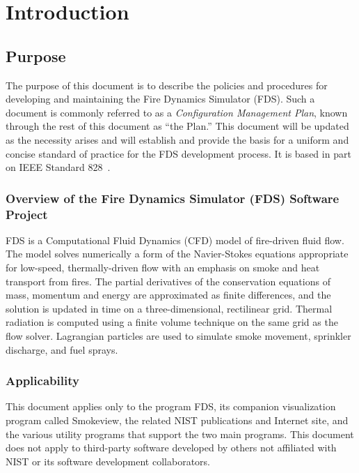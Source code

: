 \documentclass[11pt]{book}
\begin{document}
\tableofcontents

\mainmatter

\chapter{Introduction}


\section{Purpose}

The purpose of this document is to describe the policies and procedures for developing and maintaining the Fire Dynamics Simulator (FDS).
Such a document is commonly referred to as a {\em Configuration Management Plan},
known through the rest of this document as ``the Plan.'' This document will be updated as the necessity arises and will establish and provide
the basis for a uniform and concise standard of practice for the FDS development process. It is based in part on IEEE Standard 828~\cite{IEEE-828}.


\subsection{Overview of the Fire Dynamics Simulator (FDS) Software Project}

FDS is a Computational Fluid Dynamics (CFD) model of fire-driven fluid flow.
The model solves numerically a form of the Navier-Stokes equations appropriate
for low-speed, thermally-driven flow with an emphasis on smoke and heat transport
from fires. The partial derivatives of the conservation equations of mass, momentum and energy are approximated
as finite differences, and the solution is updated in time on a three-dimensional, rectilinear grid.
Thermal radiation is computed using a finite volume technique on the same grid as the flow solver.
Lagrangian particles are used to simulate smoke movement, sprinkler discharge, and fuel sprays.

\subsection{Applicability}

This document applies only to the program FDS, its companion visualization program called Smokeview,  the related NIST publications and Internet site, and
the various utility programs that support the two main programs. This document does not apply to third-party software developed by others not affiliated with
NIST or its software development collaborators.
\end{document}
